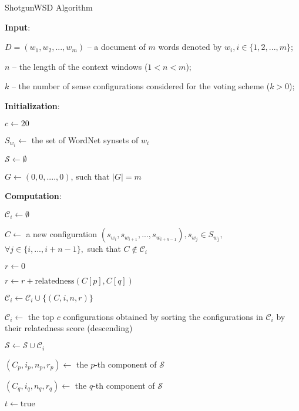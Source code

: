 \documentclass[11pt]{article}
\begin{document}
\begin{algorithm*}[!th]
\small{
\caption{ShotgunWSD Algorithm\label{alg_ShotgunWSD}}

\textbf{Input}: 

$D = (w_1, w_2, ..., w_m)$ -- a document of $m$ words denoted by $w_i, i \in \{1,2, ..., m\}$;

$n$ -- the length of the context windows ($1 < n < m$);

$k$ -- the number of sense configurations considered for the voting scheme ($k > 0$);

\BlankLine
\textbf{Initialization}:

$c \leftarrow 20$\;

{		
		$S_{w_i} \leftarrow$ the set of WordNet synsets of $w_i$\;
}

$\mathcal{S} \leftarrow \emptyset$\;

$G \leftarrow (0,0,....,0)$, such that $|G| = m$\;

\BlankLine
\textbf{Computation}:

{
		$\mathcal{C}_i \leftarrow \emptyset$\;
		
		{
				$C \leftarrow$ a new configuration $(s_{w_i}, s_{w_{i+1}},..., s_{w_{i+n-1}}), s_{w_{j}} \in S_{w_{j}},$ $\forall j \in \{i,...,i+n-1\},$ such that $C \notin \mathcal{C}_i$\;
				
				$r \leftarrow 0$\;
				
				{
						{
								$r \leftarrow r + \mbox{relatedness}(C[p], C[q])$\;
						}
				}
				
				$\mathcal{C}_i \leftarrow \mathcal{C}_i \cup \{(C, i, n, r)\}$\;
		}
		
		$\mathcal{C}_i \leftarrow$ the top $c$ configurations obtained by sorting the configurations in $\mathcal{C}_i$ by their relatedness score (descending)\;
		
		$\mathcal{S} \leftarrow \mathcal{S} \cup \mathcal{C}_i $\;
}

{
		{
				$(C_p, i_p, n_p, r_p) \leftarrow$ the $p$-th component of $\mathcal{S}$\;
	
				{
						$(C_q, i_q, n_q, r_q) \leftarrow$ the $q$-th component of $\mathcal{S}$\;
				
						{
								$t \leftarrow \mbox{true}$\;
								
}}}}}
\end{algorithm*}
\end{document}
